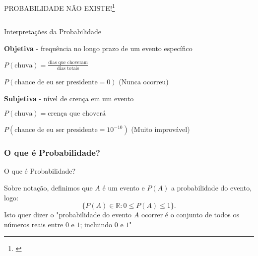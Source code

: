 \begin{frame}{PROBABILIDADE NÃO EXISTE!\footnote{\textcite{definettiTheoryProbability1974}}}
\begin{columns}
\begin{column}{0.4\textwidth}
		\end{column}
	\end{columns}
\end{frame}

\begin{frame}{Interpretações da Probabilidade}
	\begin{vfilleditems}
		\item \textbf{Objetiva} - frequência no longo prazo de um evento específico
		\begin{vfilleditems}
			\item $P(\text{chuva}) = \frac{\text{dias que choveram}}{\text{dias totais}}$
			\item $P(\text{chance de eu ser presidente} = 0)$ (Nunca ocorreu)
		\end{vfilleditems}
		\item \textbf{Subjetiva} - nível de crença em um evento
		\begin{vfilleditems}
			\item $P(\text{chuva}) = \text{crença que choverá}$
			\item $P(\text{chance de eu ser presidente} = 10^{-10})$ (Muito improvável)
		\end{vfilleditems}
	\end{vfilleditems}
\end{frame}

\subsubsection{O que é Probabilidade?}
\begin{frame}{O que é Probabilidade?}
	\begin{defn}[Probabilidade]
		Sobre notação, definimos que $A$ é um evento e $P(A)$ a probabilidade do evento, logo:
		$$
			\{P(A) \in \mathbb{R} : 0 \leq P(A) \leq 1 \}.
		$$
		\vfill
		Isto quer dizer o "probabilidade do evento $A$ ocorrer é o conjunto de
		todos os números reais entre $0$ e $1$; incluindo $0$ e $1$"
	\end{defn}
\end{frame}

